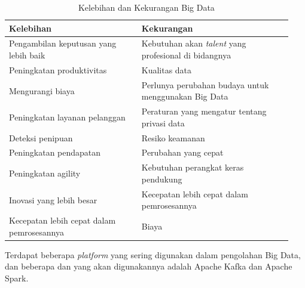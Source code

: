 \documentclass[12pt,a4paper]{report}
\begin{document}
	\begin{table}[h]
		\centering
		\caption{Kelebihan dan Kekurangan Big Data \cite{Harvey2018}}
		\begin{tabular*}{\linewidth}{|p{0.44\linewidth}|p{0.5\linewidth}|}
			\hline
			Kelebihan & Kekurangan \\ \hline
			Pengambilan keputusan yang lebih baik & Kebutuhan akan \textit{talent} yang profesional di bidangnya \\ \hline
			Peningkatan produktivitas & Kualitas data \\ \hline
			Mengurangi biaya & Perlunya perubahan budaya untuk menggunakan Big Data \\ \hline
			Peningkatan layanan pelanggan & Peraturan yang mengatur tentang privasi data \\ \hline
			Deteksi penipuan & Resiko keamanan \\ \hline
			Peningkatan pendapatan & Perubahan yang cepat \\ \hline
			Peningkatan agility & Kebutuhan perangkat keras pendukung \\ \hline
			Inovasi yang lebih besar & Kecepatan lebih cepat dalam pemrosesannya  \\ \hline
			Kecepatan lebih cepat dalam pemrosesannya & Biaya \\ \hline
		\end{tabular*}
	\end{table}
	Terdapat beberapa \textit{platform} yang sering digunakan dalam pengolahan Big Data, dan beberapa dan yang akan digunakannya adalah Apache Kafka dan Apache Spark. 
	
\end{document}
